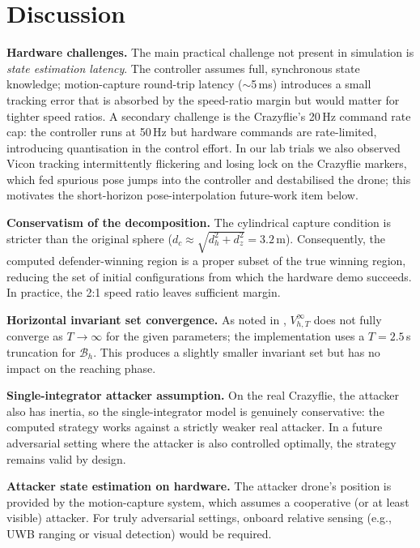 \documentclass[conference]{IEEEtran}
\begin{document}
\section{Discussion}
\label{sec:discussion}

\textbf{Hardware challenges.}
The main practical challenge not present in simulation is \emph{state estimation latency}. The controller assumes full, synchronous state knowledge; motion-capture round-trip latency ($\sim$5\,ms) introduces a small tracking error that is absorbed by the speed-ratio margin but would matter for tighter speed ratios. A secondary challenge is the Crazyflie's 20\,Hz command rate cap: the controller runs at 50\,Hz but hardware commands are rate-limited, introducing quantisation in the control effort. In our lab trials we also observed Vicon tracking intermittently flickering and losing lock on the Crazyflie markers, which fed spurious pose jumps into the controller and destabilised the drone; this motivates the short-horizon pose-interpolation future-work item below.

\textbf{Conservatism of the decomposition.}
The cylindrical capture condition is stricter than the original sphere ($d_c \approx \sqrt{d_h^2 + d_z^2} = 3.2\,$m). Consequently, the computed defender-winning region is a proper subset of the true winning region, reducing the set of initial configurations from which the hardware demo succeeds. In practice, the 2:1 speed ratio leaves sufficient margin.

\textbf{Horizontal invariant set convergence.}
As noted in \cite{bui2025reach}, $V_{h,T}^\infty$ does not fully converge as $T \to \infty$ for the given parameters; the implementation uses a $T = 2.5\,$s truncation for $\mathcal{B}_h$. This produces a slightly smaller invariant set but has no impact on the reaching phase.

\textbf{Single-integrator attacker assumption.}
On the real Crazyflie, the attacker also has inertia, so the single-integrator model is genuinely conservative: the computed strategy works against a strictly weaker real attacker. In a future adversarial setting where the attacker is also controlled optimally, the strategy remains valid by design.

\textbf{Attacker state estimation on hardware.}
The attacker drone's position is provided by the motion-capture system, which assumes a cooperative (or at least visible) attacker. For truly adversarial settings, onboard relative sensing (e.g., UWB ranging or visual detection) would be required.
\end{document}
